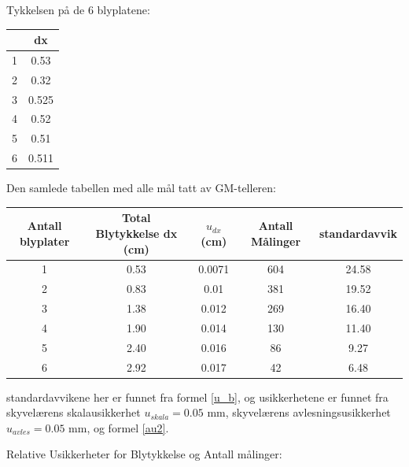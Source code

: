 Tykkelsen på de 6 blyplatene:

\begin{center}
\begin{tabular}{ | c | c | }
    \hline
    & dx\\ 
    \hline
    1 & 0.53\\ 
    \hline
    2 & 0.32\\ 
    \hline
    3 & 0.525\\ 
    \hline
    4 & 0.52\\ 
    \hline
    5 & 0.51\\ 
    \hline
    6 & 0.511\\ 
    \hline
\end{tabular}
\end{center}

Den samlede tabellen med alle mål tatt av GM-telleren:

\begin{center}
\begin{tabular}{ | c | c | c | c | c | }
    \hline
    Antall blyplater & Total Blytykkelse dx (cm) & $u_{dx}$ (cm) & Antall Målinger & standardavvik\\ 
    \hline
    1 & 0.53 & 0.0071 & 604 & 24.58\\ 
    \hline
    2 & 0.83 & 0.01 &381 & 19.52\\ 
    \hline
    3 & 1.38 & 0.012 &269 & 16.40\\ 
    \hline
    4 & 1.90 & 0.014 &130 & 11.40\\ 
    \hline
    5 & 2.40 & 0.016 &86 & 9.27\\ 
    \hline
    6 & 2.92 & 0.017 &42 & 6.48\\ 
    \hline
\end{tabular}
 \label{bigtable}
\end{center}

standardavvikene her er funnet fra formel \ref{u_b}, og usikkerhetene er funnet fra skyvelærens skalausikkerhet $u_{skala} = 0.05$ mm, skyvelærens avlesningsusikkerhet $u_{avles} = 0.05$ mm, og formel \ref{au2}.

Relative Usikkerheter for Blytykkelse og Antall målinger:

